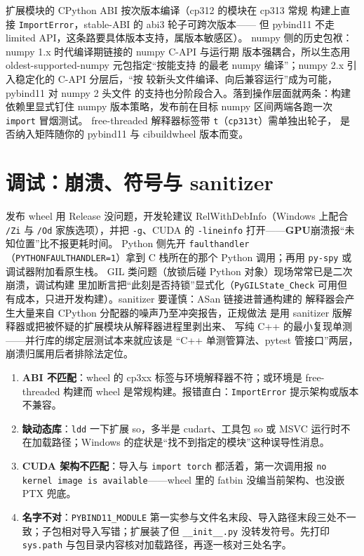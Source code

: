 \documentclass[12pt,a4paper,fontset=fandol]{ctexbook}
\newcommand{\Tp}[1]{\texttt{#1}}
\newcommand{\Dom}[1]{\textsf{\bfseries #1}}
\newcommand{\GPU}{\Dom{GPU}}
\begin{document}
扩展模块的 CPython ABI 按次版本编译（cp312 的模块在 cp313 常规
构建上直接 \Tp{ImportError}，stable-ABI 的 abi3 轮子可跨次版本——
但 pybind11 不走 limited API，这条路要具体版本支持，属版本敏感区）。
numpy 侧的历史包袱：numpy 1.x 时代编译期链接的 numpy C-API 与运行期
版本强耦合，所以生态用 oldest-supported-numpy 元包指定``按能支持
的最老 numpy 编译''；numpy 2.x 引入稳定化的 C-API 分层后，``按
较新头文件编译、向后兼容运行''成为可能，pybind11 对 numpy 2 头文件
的支持也分阶段合入。落到操作层面就两条：构建依赖里显式钉住 numpy
版本策略，发布前在目标 numpy 区间两端各跑一次 \Tp{import} 冒烟测试。
free-threaded 解释器标签带 \Tp{t}（\Tp{cp313t}）需单独出轮子，
是否纳入矩阵随你的 pybind11 与 cibuildwheel 版本而变。

\section{调试：崩溃、符号与 sanitizer}

发布 wheel 用 Release 没问题，开发轮建议 RelWithDebInfo（Windows
上配合 \Tp{/Zi} 与 \Tp{/Od} 家族选项），并把 \Tp{-g}、CUDA 的
\Tp{-lineinfo} 打开——\GPU{}崩溃报``未知位置''比不报更耗时间。
Python 侧先开 \Tp{faulthandler}（\Tp{PYTHONFAULTHANDLER=1}）拿到
C 栈所在的那个 Python 调用；再用 \Tp{py-spy} 或调试器附加看原生栈。
GIL 类问题（放锁后碰 Python 对象）现场常常已是二次崩溃，调试构建
里加断言把``此刻是否持锁''显式化（\Tp{PyGILState\_Check} 可用但
有成本，只进开发构建）。sanitizer 要谨慎：ASan 链接进普通构建的
解释器会产生大量来自 CPython 分配器的噪声乃至冲突报告，正规做法
是用 sanitizer 版解释器或把被怀疑的扩展模块从解释器进程里剥出来、
写纯 C++ 的最小复现单测——并行库的绑定层测试本来就应该是
``C++ 单测管算法、pytest 管接口''两层，崩溃归属用后者排除法定位。

\begin{note}[title={模块导入失败的四种真实原因}]
\begin{enumerate}[label=\arabic*.)]
\item \textbf{ABI 不匹配}：wheel 的 cp3xx 标签与环境解释器不符；或环境是 free-threaded 构建而 wheel 是常规构建。报错直白：\Tp{ImportError} 提示架构或版本不兼容。
\item \textbf{缺动态库}：\Tp{ldd} 一下扩展 so，多半是 cudart、工具包 so 或 MSVC 运行时不在加载路径；Windows 的症状是``找不到指定的模块''这种误导性消息。
\item \textbf{CUDA 架构不匹配}：导入与 \Tp{import torch} 都活着，第一次调用报 \Tp{no kernel image is available}——wheel 里的 fatbin 没编当前架构、也没嵌 PTX 兜底。
\item \textbf{名字不对}：\Tp{PYBIND11\_MODULE} 第一实参与文件名末段、导入路径末段三处不一致；子包相对导入写错；扩展装了但 \Tp{\_\_init\_\_.py} 没转发符号。先打印 \Tp{sys.path} 与包目录内容核对加载路径，再逐一核对三处名字。
\end{enumerate}
\end{note}
\end{document}
